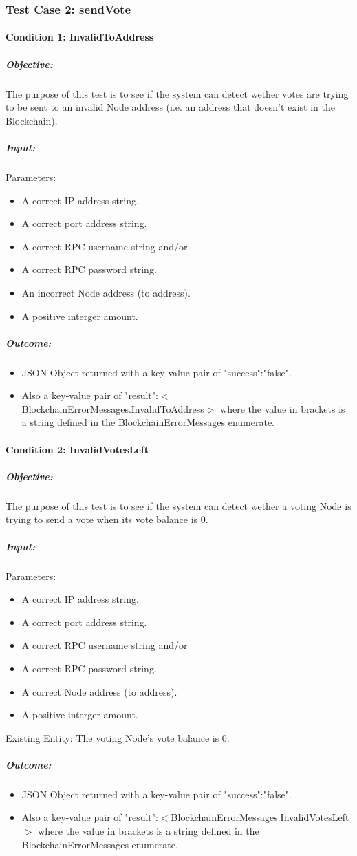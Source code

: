 \documentclass[11pt]{article}
\begin{document}
	\subsubsection{Test Case 2: sendVote}
	\paragraph{Condition 1: InvalidToAddress}	
	\subparagraph{Objective:}
	The purpose of this test is to see if the system can detect wether votes are trying to be sent to an invalid Node address (i.e. an address that doesn't exist in the Blockchain).
	\subparagraph{Input:}
	Parameters:
	\begin{itemize}
		\item A correct IP address string.
		\item A correct port address string.
		\item A correct RPC username string and/or
		\item A correct RPC password string.
		\item An incorrect Node address (to address).
		\item A positive interger amount.
	\end{itemize}
	\subparagraph{Outcome:}
	\begin{itemize}
		\item JSON Object returned with a key-value pair of "success":"false".
		\item Also a key-value pair of "result":$<$BlockchainErrorMessages.InvalidToAddress$>$ where the value in brackets is a string defined in the BlockchainErrorMessages enumerate.
	\end{itemize}

	\paragraph{Condition 2: InvalidVotesLeft}	
	\subparagraph{Objective:}
	The purpose of this test is to see if the system can detect wether a voting Node is trying to send a vote when its vote balance is 0.
	\subparagraph{Input:}
	Parameters:
	\begin{itemize}
		\item A correct IP address string.
		\item A correct port address string.
		\item A correct RPC username string and/or
		\item A correct RPC password string.
		\item A correct Node address (to address).
		\item A positive interger amount.
	\end{itemize}
	Existing Entity: The voting Node's vote balance is 0.
	\subparagraph{Outcome:}
	\begin{itemize}
		\item JSON Object returned with a key-value pair of "success":"false".
		\item Also a key-value pair of "result":$<$BlockchainErrorMessages.InvalidVotesLeft$>$ where the value in brackets is a string defined in the BlockchainErrorMessages enumerate.
	\end{itemize}
	
\end{document}
